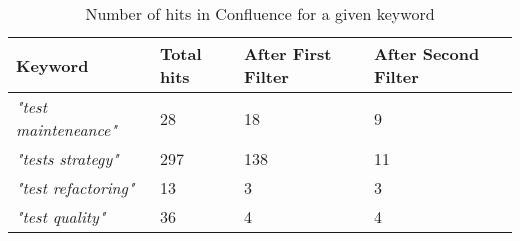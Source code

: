 \begin{table}[htb]
	\centering
	\caption{Number of hits in Confluence for a given keyword}
	\label{tab:confluenceMiningResults}
	\begin{tabulary}{\textwidth}{|L|L|L|L|}
		\hline
		\textbf{Keyword} & 
		\textbf{Total hits} &
		\textbf{After First Filter} &
		\textbf{After Second Filter}\\ \hline
		
		\textit{"test mainteneance"} &
		28 &
		18 &
		9 \\ \hline
		
		\textit{"tests strategy"} &
		297 &
		138 &
		11 \\ \hline
		
		\textit{"test refactoring"} &
		13 &
		3 &
		3 \\ \hline
		
		\textit{"test quality"} &
		36 &
		4 &
		4 \\ \hline
		

	\end{tabulary}		
\end{table}